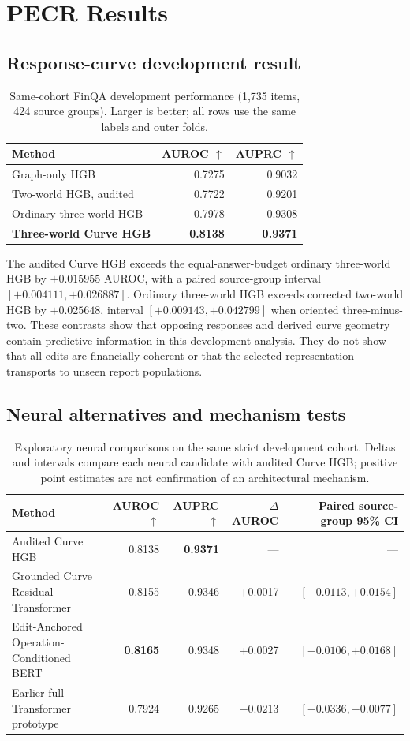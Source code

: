 \documentclass[11pt]{article}
\begin{document}
\section{PECR Results}
\subsection{Response-curve development result}
\begin{table}[t]
\centering
\small
\caption{Same-cohort FinQA development performance (1,735 items, 424 source groups). Larger is better; all rows use the same labels and outer folds.}
\label{tab:main}
\begin{tabular}{lrr}
\toprule
Method & AUROC $\uparrow$ & AUPRC $\uparrow$ \\
\midrule
Graph-only HGB & 0.7275 & 0.9032 \\
Two-world HGB, audited & 0.7722 & 0.9201 \\
Ordinary three-world HGB & 0.7978 & 0.9308 \\
\textbf{Three-world Curve HGB} & \textbf{0.8138} & \textbf{0.9371} \\
\bottomrule
\end{tabular}
\end{table}

The audited Curve HGB exceeds the equal-answer-budget ordinary three-world HGB by $+0.015955$ AUROC, with a paired source-group interval $[+0.004111,+0.026887]$. Ordinary three-world HGB exceeds corrected two-world HGB by $+0.025648$, interval $[+0.009143,+0.042799]$ when oriented three-minus-two. These contrasts show that opposing responses and derived curve geometry contain predictive information in this development analysis. They do not show that all edits are financially coherent or that the selected representation transports to unseen report populations.

\subsection{Neural alternatives and mechanism tests}\label{sec:neural-results}
\begin{table}[t]
\centering
\small
\caption{Exploratory neural comparisons on the same strict development cohort. Deltas and intervals compare each neural candidate with audited Curve HGB; positive point estimates are not confirmation of an architectural mechanism.}
\label{tab:neural}
\begin{tabular}{lrrrr}
\toprule
Method & AUROC $\uparrow$ & AUPRC $\uparrow$ & $\Delta$AUROC & Paired source-group 95\% CI \\
\midrule
Audited Curve HGB & 0.8138 & \textbf{0.9371} & --- & --- \\
Grounded Curve Residual Transformer & 0.8155 & 0.9346 & +0.0017 & $[-0.0113,+0.0154]$ \\
Edit-Anchored Operation-Conditioned BERT & \textbf{0.8165} & 0.9348 & +0.0027 & $[-0.0106,+0.0168]$ \\
Earlier full Transformer prototype & 0.7924 & 0.9265 & $-0.0213$ & $[-0.0336,-0.0077]$ \\
\bottomrule
\end{tabular}
\end{table}
\end{document}
